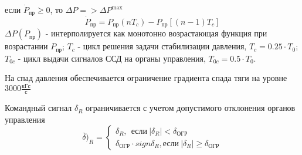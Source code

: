 если $\dot{P}_\text{пр} \geq 0 $, то $\Delta P => \Delta P^{\max}$
\begin{equation}
	\dot{P}_\text{пр} = P_\text{пр}(nT_c) - P_\text{пр}[(n-1)T_c]
\end{equation}
$\Delta P (P_\text{пр})$ - интерполируется как монотонно возрастающая функция при возрастании $P_\text{пр}$; $T_c$ - цикл решения задачи стабилизации давления, $T_c = 0.25\cdot T_0$; $T_{0c}$ - цикл выдачи сигналов ССД на органы управления, $T_{0c} = 0.5 \cdot T_0$.

На спад давления обеспечивается ограничение градиента спада тяги на уровне $3000 \frac{кГс}{с}$

Командный сигнал $\delta_R$ ограничивается с учетом допустимого отклонения органов управления
\begin{equation}
	\overline{\delta})_R = \left\{ \begin{matrix} \delta_R, \ \  \text{если} \  |\delta_R| < \delta_{\text{ОГР}} \\ \delta_\text{ОГР} \cdot sign \delta_R, \text{если} \ |\delta_R | \geq \delta_\text{ОГР} \end{matrix} \right.
\end{equation}

\clearpage

